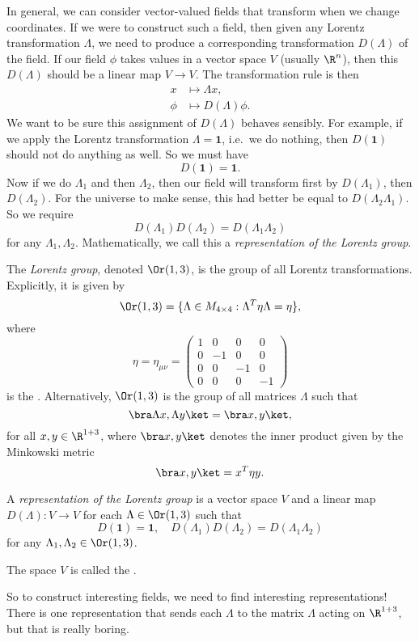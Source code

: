 \documentclass[a4paper]{article}
\begin{document}
In general, we can consider vector-valued fields that transform when we change coordinates. If we were to construct such a field, then given any Lorentz transformation $\Lambda$, we need to produce a corresponding transformation $D(\Lambda)$ of the field. If our field $\phi$ takes values in a vector space $V$ (usually $\R^n$), then this $D(\Lambda)$ should be a linear map $V \to V$. The transformation rule is then
\begin{align*}
  x &\mapsto \Lambda x,\\
  \phi &\mapsto D(\Lambda) \phi.
\end{align*}
We want to be sure this assignment of $D(\Lambda)$ behaves sensibly. For example, if we apply the Lorentz transformation $\Lambda = \mathbf{1}$, i.e.\ we do nothing, then $D(\mathbf{1})$ should not do anything as well. So we must have
\[
  D(\mathbf{1}) = \mathbf{1}.
\]
Now if we do $\Lambda_1$ and then $\Lambda_2$, then our field will transform first by $D(\Lambda_1)$, then $D(\Lambda_2)$. For the universe to make sense, this had better be equal to $D(\Lambda_2 \Lambda_1)$. So we require
\[
  D(\Lambda_1)D(\Lambda_2) = D(\Lambda_1 \Lambda_2)
\]
for any $\Lambda_1, \Lambda_2$. Mathematically, we call this a \emph{representation of the Lorentz group}.
\begin{defi}
  The \emph{Lorentz group}, denoted $\Or(1, 3)$, is the group of all Lorentz transformations. Explicitly, it is given by
  \[
    \Or(1, 3) = \{\Lambda \in M_{4\times 4}: \Lambda^T \eta \Lambda = \eta\},
  \]
  where
  \[
    \eta = \eta_{\mu\nu} =
    \begin{pmatrix}
      1 & 0 & 0 & 0\\
      0 & -1 & 0 & 0\\
      0 & 0 & -1 & 0\\
      0 & 0 & 0 & -1
    \end{pmatrix}
  \]
  is the . Alternatively, $\Or(1, 3)$ is the group of all matrices $\Lambda$ such that
  \[
    \bra \Lambda x, \Lambda y\ket = \bra x, y\ket,
  \]
  for all $x, y \in \R^{1 + 3}$, where $\bra x, y\ket$ denotes the inner product given by the Minkowski metric
  \[
    \bra x, y\ket = x^T \eta y.
  \]
\end{defi}
\begin{defi}
  A \emph{representation of the Lorentz group} is a vector space $V$ and a linear map $D(\Lambda): V \to V$ for each $\Lambda \in \Or(1, 3)$ such that
  \[
    D(\mathbf{1}) = \mathbf{1}, \quad D(\Lambda_1)D(\Lambda_2) = D(\Lambda_1 \Lambda_2)
  \]
  for any $\Lambda_1, \Lambda_2 \in \Or(1, 3)$.

  The space $V$ is called the .
\end{defi}
So to construct interesting fields, we need to find interesting representations! There is one representation that sends each $\Lambda$ to the matrix $\Lambda$ acting on $\R^{1 + 3}$, but that is really boring.
\end{document}
